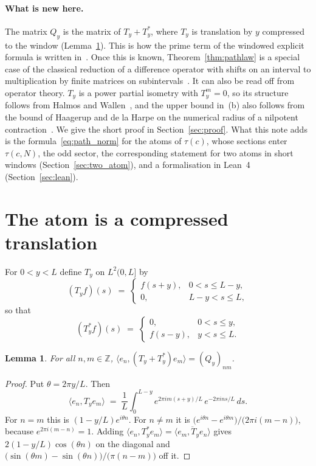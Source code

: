 \documentclass[11pt,a4paper]{article}
\theoremstyle{plain}
\newtheorem{lemma}[theorem]{Lemma}
\theoremstyle{definition}
\theoremstyle{remark}
\newcommand{\Z}{\mathbb{Z}}
\begin{document}
\paragraph{What is new here.} The matrix $Q_y$ is the matrix of $T_y + T_y^{*}$, where $T_y$ is translation by $y$ compressed to the window (Lemma~\ref{lem:shift}). This is how the prime term of the windowed explicit formula is written in~\cite{CCM2025}. Once this is known, Theorem~\ref{thm:pathlaw} is a special case of the classical reduction of a difference operator with shifts on an interval to multiplication by finite matrices on subintervals~\cite{Skubachevskii1997, Skubachevskii2016}. It can also be read off from operator theory. $T_y$ is a power partial isometry with $T_y^m = 0$, so its structure follows from Halmos and Wallen~\cite{HalmosWallen1970}, and the upper bound in~(b) also follows from the bound of Haagerup and de la Harpe on the numerical radius of a nilpotent contraction~\cite{HaagerupHarpe1992}. We give the short proof in Section~\ref{sec:proof}. What this note adds is the formula~\eqref{eq:path_norm} for the atoms of $\tau(c)$, whose sections enter $\tau(c,N)$, the odd sector, the corresponding statement for two atoms in short windows (Section~\ref{sec:two_atom}), and a formalisation in Lean~4 (Section~\ref{sec:lean}).

\section{The atom is a compressed translation}\label{sec:shift}

For $0 < y < L$ define $T_y$ on $L^2(0, L]$ by
\[
  (T_y f)(s) \;=\; \begin{cases} f(s+y), & 0 < s \le L - y, \\ 0, & L - y < s \le L, \end{cases}
\]
so that
\[
  (T_y^{*} f)(s) \;=\; \begin{cases} 0, & 0 < s \le y, \\ f(s-y), & y < s \le L. \end{cases}
\]

\begin{lemma}\label{lem:shift}
For all $n, m \in \Z$, $\langle e_n, (T_y + T_y^{*}) e_m\rangle = (Q_y)_{nm}$.
\end{lemma}

\begin{proof}
Put $\theta = 2\pi y/L$. Then
\[
  \langle e_n, T_y e_m\rangle \;=\; \frac1L \int_0^{L-y} e^{2\pi i m (s+y)/L}\, e^{-2\pi i n s/L}\, ds .
\]
For $n = m$ this is $(1 - y/L) e^{i\theta n}$. For $n \ne m$ it is $\bigl(e^{i\theta n} - e^{i\theta m}\bigr)/\bigl(2\pi i (m-n)\bigr)$, because $e^{2\pi i (m-n)} = 1$. Adding $\langle e_n, T_y^{*} e_m\rangle = \overline{\langle e_m, T_y e_n\rangle}$ gives $2(1 - y/L)\cos(\theta n)$ on the diagonal and $\bigl(\sin(\theta m) - \sin(\theta n)\bigr)/\bigl(\pi(n-m)\bigr)$ off it.
\end{proof}
\end{document}
